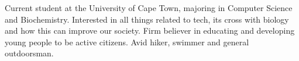 

\begin{cvparagraph}

Current student at the University of Cape Town, majoring in Computer Science and Biochemistry. Interested in all things related to tech, its cross with biology and how this can improve our society. Firm believer in educating and developing young people to be active citizens. Avid hiker, swimmer and general outdoorsman.
\end{cvparagraph}
